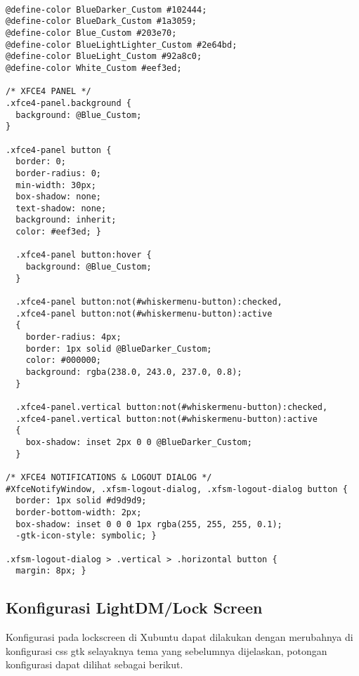 \documentclass[8pt, a4paper]{article}
\begin{document}
\begin{multicols}{2}
\begin{lstlisting}

@define-color BlueDarker_Custom #102444;
@define-color BlueDark_Custom #1a3059;
@define-color Blue_Custom #203e70;
@define-color BlueLightLighter_Custom #2e64bd;
@define-color BlueLight_Custom #92a8c0;
@define-color White_Custom #eef3ed;

/* XFCE4 PANEL */
.xfce4-panel.background {
  background: @Blue_Custom;
}

.xfce4-panel button {
  border: 0;
  border-radius: 0;
  min-width: 30px;
  box-shadow: none;
  text-shadow: none;
  background: inherit;
  color: #eef3ed; }

  .xfce4-panel button:hover {
    background: @Blue_Custom;
  }

  .xfce4-panel button:not(#whiskermenu-button):checked,
  .xfce4-panel button:not(#whiskermenu-button):active
  {
    border-radius: 4px;
    border: 1px solid @BlueDarker_Custom;
    color: #000000;
    background: rgba(238.0, 243.0, 237.0, 0.8);
  }

  .xfce4-panel.vertical button:not(#whiskermenu-button):checked,
  .xfce4-panel.vertical button:not(#whiskermenu-button):active 
  {
    box-shadow: inset 2px 0 0 @BlueDarker_Custom; 
  }

/* XFCE4 NOTIFICATIONS & LOGOUT DIALOG */
#XfceNotifyWindow, .xfsm-logout-dialog, .xfsm-logout-dialog button {
  border: 1px solid #d9d9d9;
  border-bottom-width: 2px;
  box-shadow: inset 0 0 0 1px rgba(255, 255, 255, 0.1);
  -gtk-icon-style: symbolic; }

.xfsm-logout-dialog > .vertical > .horizontal button {
  margin: 8px; }
\end{lstlisting}
\end{multicols}

\subsection{Konfigurasi LightDM/Lock Screen}

Konfigurasi pada lockscreen di Xubuntu dapat dilakukan dengan merubahnya di konfigurasi
css gtk selayaknya tema yang sebelumnya dijelaskan, potongan konfigurasi dapat
dilihat sebagai berikut.
\end{document}
